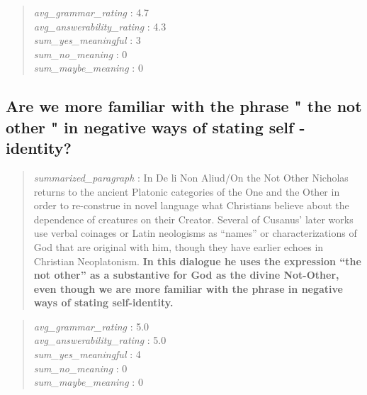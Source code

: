\begin{quote}
\emph{avg\_grammar\_rating} : 4.7\\
\emph{avg\_answerability\_rating} : 4.3\\
\emph{sum\_yes\_meaningful} : 3\\
\emph{sum\_no\_meaning} : 0\\
\emph{sum\_maybe\_meaning} : 0
\end{quote}

\hypertarget{are-we-more-familiar-with-the-phrase-the-not-other-in-negative-ways-of-stating-self---identity}{%
\subsection{Are we more familiar with the phrase " the not other " in
negative ways of stating self -
identity?}\label{are-we-more-familiar-with-the-phrase-the-not-other-in-negative-ways-of-stating-self---identity}}

\begin{quote}
\emph{summarized\_paragraph} : In De li Non Aliud/On the Not Other
Nicholas returns to the ancient Platonic categories of the One and the
Other in order to re-construe in novel language what Christians believe
about the dependence of creatures on their Creator. Several of Cusanus'
later works use verbal coinages or Latin neologisms as ``names'' or
characterizations of God that are original with him, though they have
earlier echoes in Christian Neoplatonism. \textbf{In this dialogue he
uses the expression ``the not other'' as a substantive for God as the
divine Not-Other, even though we are more familiar with the phrase in
negative ways of stating self-identity.}
\end{quote}

\begin{quote}
\emph{avg\_grammar\_rating} : 5.0\\
\emph{avg\_answerability\_rating} : 5.0\\
\emph{sum\_yes\_meaningful} : 4\\
\emph{sum\_no\_meaning} : 0\\
\emph{sum\_maybe\_meaning} : 0
\end{quote}

